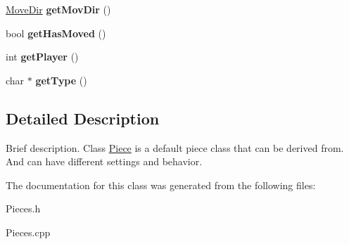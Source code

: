 \begin{DoxyCompactItemize}
\item 
\hypertarget{class_piece_ae3ab3d26428b104eea1ef049c0b65f3a}{\hyperlink{struct_move_dir}{Move\-Dir} {\bfseries get\-Mov\-Dir} ()}\label{class_piece_ae3ab3d26428b104eea1ef049c0b65f3a}

\item 
\hypertarget{class_piece_ab1aefb3821698fb08fd6eafd5e4c8f5a}{bool {\bfseries get\-Has\-Moved} ()}\label{class_piece_ab1aefb3821698fb08fd6eafd5e4c8f5a}

\item 
\hypertarget{class_piece_acc0b7c99053c361cd55f0231e3b6e272}{int {\bfseries get\-Player} ()}\label{class_piece_acc0b7c99053c361cd55f0231e3b6e272}

\item 
\hypertarget{class_piece_a39392c919bff7c404cc05b6b31e6bf32}{char $\ast$ {\bfseries get\-Type} ()}\label{class_piece_a39392c919bff7c404cc05b6b31e6bf32}

\end{DoxyCompactItemize}


\subsection{Detailed Description}
Brief description. Class \hyperlink{class_piece}{Piece} is a default piece class that can be derived from. And can have different settings and behavior. 

The documentation for this class was generated from the following files\-:\begin{DoxyCompactItemize}
\item 
Pieces.\-h\item 
Pieces.\-cpp\end{DoxyCompactItemize}
